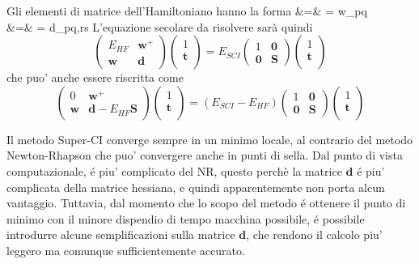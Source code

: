 Gli elementi di matrice dell'Hamiltoniano hanno la forma
\beqas
{} &=&  = w_{pq} \\
 &=&  = d_{pq,rs}
\eeqas
L'equazione secolare da risolvere sar\`a quindi
$$
\left(
\begin{array}{cc}
E_{HF} & \mathbf{w}^+ \\
\mathbf{w} & \mathbf{d}
\end{array} \right)
\left(
\begin{array}{c}
1 \\
\mathbf{t} \\
\end{array}
\right)
= E_{SCI}
\left(
\begin{array}{cc}
1 & \mathbf{0} \\
\mathbf{0} & \mathbf{S}
\end{array}
\right)
\left(
\begin{array}{c}
1 \\
\mathbf{t} \\
\end{array}
\right)
$$
che puo' anche essere riscritta come
$$
\left(
\begin{array}{cc}
0 & \mathbf{w}^+ \\
\mathbf{w} & \mathbf{d}-E_{HF}\mathbf{S}
\end{array} \right)
\left(
\begin{array}{c}
1 \\
\mathbf{t} \\
\end{array}
\right)
= \left( E_{SCI} - E_{HF} \right)
\left(
\begin{array}{cc}
1 & \mathbf{0} \\
\mathbf{0} & \mathbf{S}
\end{array}
\right)
\left(
\begin{array}{c}
1 \\
\mathbf{t} \\
\end{array}
\right)
$$

Il metodo Super-CI converge sempre in un minimo locale, al contrario del
metodo Newton-Rhapson che puo' convergere anche in punti di sella.
Dal punto di vista computazionale, \'e piu' complicato del NR, questo
perch\`e la matrice $\mathbf{d}$ \'e piu' complicata della matrice
hessiana, e quindi apparentemente non porta alcun vantaggio. Tuttavia,
dal momento che lo scopo del metodo \'e ottenere il punto di minimo con
il minore dispendio di tempo macchina possibile, \'e possibile introdurre
alcune semplificazioni sulla matrice $\mathbf{d}$, che rendono il
calcolo piu' leggero ma comunque sufficientemente accurato.

